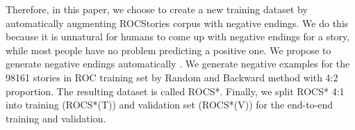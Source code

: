 Therefore, in this paper, we choose to create a new training dataset
by automatically augmenting ROCStories corpus with negative endings.
We do this because it is unnatural for humans to come up with negative
endings for a story, while most people have no problem predicting a positive
one.
We propose to generate negative endings automatically \cite{roemmele2017rnn}. 
We generate negative examples for the 98161 stories in ROC training set 
by Random and Backward method with 4:2 proportion. The resulting dataset
is called ROCS*.
Finally, we split ROCS* 4:1 into training (ROCS*(T)) and 
validation set (ROCS*(V)) for the end-to-end training and validation. 

%
%
%
%
 
